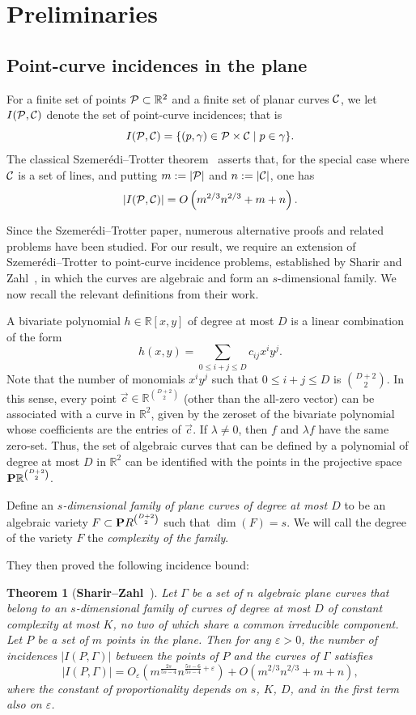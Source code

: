 \documentclass[letterpaper, reqno,11pt]{article}
\newcommand{\RR}{\mathbb{R}}
\newcommand{\eps}{\varepsilon}
\newtheorem{thm}{Theorem}%
\theoremstyle{definition}
\theoremstyle{remark}
\begin{document}
\section{Preliminaries}\label{sec:pre}

\subsection{Point-curve incidences in the plane}
For a finite set of points ${\cal P}\subset \RR^2$ and a finite set of planar curves ${\cal C}$, we let $I({\cal P}, {\cal C})$ denote the set of point-curve incidences; that is
$$
I({\cal P},{\cal C})=\{(p,\gamma)\in {\cal P}\times{\cal C}\mid p\in \gamma\}.
$$
The classical Szemer\'edi--Trotter theorem~\cite{SzeTro} asserts that, for the special case where ${\cal C}$ is a set of lines, and putting  $m:=|{\cal P}|$ and $n:=|{\cal C}|$, one has 
$$
\left|I({\cal P},{\cal C})\right|=O\left(m^{2/3}n^{2/3}+m+n\right).
$$

Since the Szemer\'edi--Trotter paper, numerous alternative proofs and related problems have been studied. For our result, we require an extension of Szemer\'edi--Trotter to point-curve incidence problems, established by Sharir and Zahl~\cite{ShaZah}, in which the curves are algebraic and form an 
$s$-dimensional family. 
We now recall the relevant definitions from their work.

A bivariate polynomial $h\in\RR[x,y]$ of degree at most $D$ is a linear combination of the form
$$
h(x,y)=\sum_{0\le i+j\le D}c_{ij}x^iy^j.
$$
Note that the number of monomials $x^iy^j$ such that $0\le i+j\le D$ is $\binom{D+2}{2}$.
In this sense, every point $\vec{c}\in \RR^{\binom{D+2}{2}}$ (other than the all-zero vector) can be associated with a curve in $\RR^2$, given by the zeroset of the bivariate polynomial whose coefficients are the entries of $\vec{c}$. 
If $\lambda\neq 0$, then $f$ and $\lambda f$ have the same zero-set.
Thus, the set
of algebraic curves that can be defined by a polynomial of degree at most $D$ in $\RR^2$ can
be identified with the points in the projective space 
${\bf P}\RR^{\binom{D+2}{2}}$.

Define an \emph{$s$-dimensional family of plane curves of degree at most $D$} to be  an algebraic variety $F\subset{\bf P}\mathbf \RR^{\binom{D+2}{2}}$ such that $\dim(F)=s$. We will call the degree of the variety $F$ the \emph{complexity of the family}. 

They then proved the following incidence bound:
\begin{thm}[{\bf Sharir--Zahl~\cite{ShaZah}}] \label{ShaZah}
Let $\Gamma$ be a set of $n$ algebraic plane curves that belong to an $s$-dimensional family of curves of degree at most $D$ of constant complexity at most $K$, no two of which
share a common irreducible component. 
Let $P$ be a set of $m$ points in the plane. Then
for any $\eps>0$, the number of incidences $|I(P,\Gamma)|$ between the points of $P$ and the curves
of $\Gamma$ satisfies
$$
|I(P,\Gamma)|=O_\eps\left( m^{\frac{2s}{5s-4}}n^{\frac{5s-6}{5s-4}+\eps}\right)+O\left(m^{2/3}n^{2/3}+m+n\right),
$$
where the constant of proportionality depends on $s$, $K$, $D$, and in the first term also on $\eps$.
\end{thm}
\end{document}
